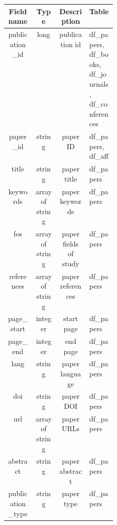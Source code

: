 \begin{table}[H]
    \begin{center}
        \begin{tabular}{| c | c | c | p{0.25\linewidth} |}
            \hline
            \textbf{Field name} & \textbf{Type}   & \textbf{Description}  & \textbf{Table} \T\B                                      \\
            \hline \hline
            publication\_id     & long            & publication id        & df\_papers, df\_books, df\_journals, df\_conferences\T\B \\
            paper\_id           & string          & paper ID              & df\_papers, df\_aff\T\B                                  \\
            title               & string          & paper title           & df\_papers\T\B                                           \\
            keywords            & array of string & paper keywords        & df\_papers\T\B                                           \\
            fos                 & array of string & paper fields of study & df\_papers\T\B                                           \\
            references          & array of string & paper references      & df\_papers\T\B                                           \\
            page\_start         & integer         & start page            & df\_papers\T\B                                           \\
            page\_end           & integer         & end page              & df\_papers\T\B                                           \\
            lang                & string          & paper language        & df\_papers\T\B                                           \\
            doi                 & string          & paper DOI             & df\_papers\T\B                                           \\
            url                 & array of string & paper URLs            & df\_papers\T\B                                           \\
            abstract            & string          & paper abstract        & df\_papers\T\B                                           \\
            publication\_type   & string          & paper type            & df\_papers\T\B                                           \\

\end{tabular}
\end{center}
\end{table}
